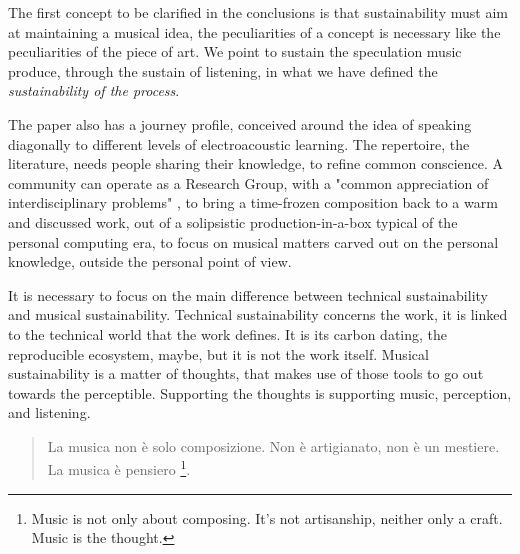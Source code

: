 \documentclass{article}
\begin{document}
The first concept to be clarified in the conclusions is that sustainability must aim at maintaining a musical idea, the peculiarities of a concept is necessary like  the peculiarities of the piece of art. We point to sustain the speculation music produce, through the sustain of listening, in what we have defined the \emph{sustainability of the process}. 

The paper also has a journey profile, conceived around the idea of speaking diagonally to different levels of electroacoustic learning.  The repertoire, the literature, needs people sharing their knowledge, to refine common conscience. A community can operate as a Research Group, with a "common appreciation of interdisciplinary problems" \cite{ml91}, to bring a time-frozen composition back to a warm and discussed work, out of a solipsistic production-in-a-box typical of the personal computing era, to focus on musical matters carved out on the personal knowledge, outside the personal point of view. 

It is necessary to focus on the main difference between technical sustainability and musical sustainability. Technical sustainability concerns the work, it is linked to the technical world that the work defines. It is its carbon dating, the reproducible ecosystem, maybe, but it is not the work itself. Musical sustainability is a matter of thoughts, that makes use of those tools to go out towards the perceptible. Supporting the thoughts is supporting music, perception, and listening.

\begin{quote}
La musica non è solo composizione. Non è artigianato, non è un mestiere. La musica è pensiero \cite{nono85}\footnote{Music is not only about composing. It’s not artisanship, neither only a craft. Music is the thought.}.
\end{quote}

\end{document}
